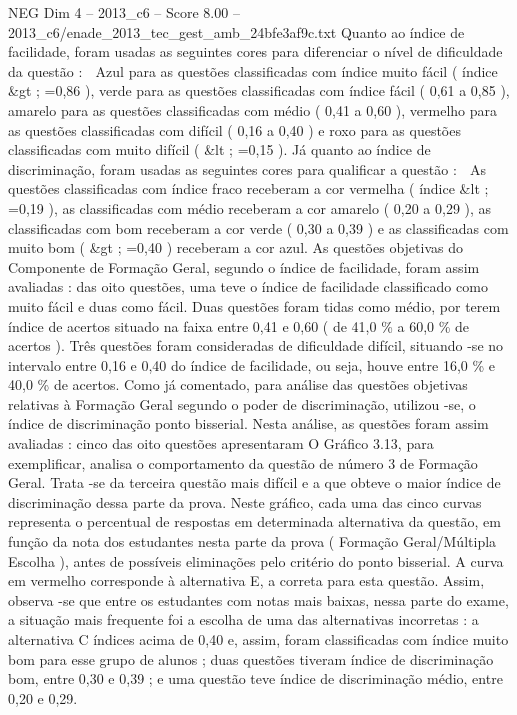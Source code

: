 \begin{textsample}{NEG Dim 4 – 2013\_c6 – Score 8.00 – 2013\_c6/enade\_2013\_tec\_gest\_amb\_24bfe3af9c.txt}
Quanto ao índice de facilidade, foram usadas as seguintes cores para diferenciar o nível de dificuldade da questão :  Azul para as questões classificadas com índice muito fácil ( índice \&gt ; =0,86 ), verde para as questões classificadas com índice fácil ( 0,61 a 0,85 ), amarelo para as questões classificadas com médio ( 0,41 a 0,60 ), vermelho para as questões classificadas com difícil ( 0,16 a 0,40 ) e roxo para as questões classificadas com muito difícil ( \&lt ; =0,15 ).
Já quanto ao índice de discriminação, foram usadas as seguintes cores para qualificar a questão :  As questões classificadas com índice fraco receberam a cor vermelha ( índice \&lt ; =0,19 ), as classificadas com médio receberam a cor amarelo ( 0,20 a 0,29 ), as classificadas com bom receberam a cor verde ( 0,30 a 0,39 ) e as classificadas com muito bom ( \&gt ; =0,40 ) receberam a cor azul.
As questões objetivas do Componente de Formação Geral, segundo o índice de facilidade, foram assim avaliadas : das oito questões, uma teve o índice de facilidade classificado como muito fácil e duas como fácil.
Duas questões foram tidas como médio, por terem índice de acertos situado na faixa entre 0,41 e 0,60 ( de 41,0 \% a 60,0 \% de acertos ).
Três questões foram consideradas de dificuldade difícil, situando -se no intervalo entre 0,16 e 0,40 do índice de facilidade, ou seja, houve entre 16,0 \% e 40,0 \% de acertos.
Como já comentado, para análise das questões objetivas relativas à Formação Geral segundo o poder de discriminação, utilizou -se, o índice de discriminação ponto bisserial.
Nesta análise, as questões foram assim avaliadas : cinco das oito questões apresentaram O Gráfico 3.13, para exemplificar, analisa o comportamento da questão de número 3 de Formação Geral.
Trata -se da terceira questão mais difícil e a que obteve o maior índice de discriminação dessa parte da prova.
Neste gráfico, cada uma das cinco curvas representa o percentual de respostas em determinada alternativa da questão, em função da nota dos estudantes nesta parte da prova ( Formação Geral/Múltipla Escolha ), antes de possíveis eliminações pelo critério do ponto bisserial.
A curva em vermelho corresponde à alternativa E, a correta para esta questão.
Assim, observa -se que entre os estudantes com notas mais baixas, nessa parte do exame, a situação mais frequente foi a escolha de uma das alternativas incorretas : a alternativa C índices acima de 0,40 e, assim, foram classificadas com índice muito bom para esse grupo de alunos ; duas questões tiveram índice de discriminação bom, entre 0,30 e 0,39 ; e uma questão teve índice de discriminação médio, entre 0,20 e 0,29.

\end{textsample}
